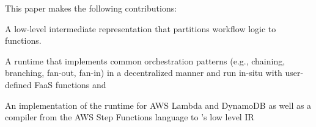 This paper makes the following contributions:

\squishlist

  \item A low-level intermediate representation that partitions workflow logic
  to functions.

  \item A runtime that implements common orchestration patterns
  (e.g., chaining, branching, fan-out, fan-in) in a decentralized manner and
  run in-situ with user-defined FaaS functions and

  \item An implementation of the \name{} runtime for AWS Lambda and 
DynamoDB as well as a compiler from the AWS Step Functions language to
\name{}'s low level IR

\squishend

